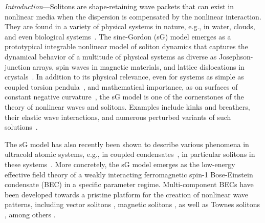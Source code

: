 \documentclass[aps,

               pra,
               twocolumn,
               amsmath,
               amssymb,
               superscriptaddress,
               reprint,
               10pt
              ]{revtex4-2}
\begin{document}
\begin{abstract}
We experimentally generate sine-Gordon-like solitons in a spin-1 spinor Bose-Einstein condensate (BEC) utilizing a robust and reproducible local phase-imprinting scheme. We find that the soliton velocity can be tuned by the effective quadratic Zeeman shift. This enables the investigation of controlled soliton interactions, in which we observe the characteristic
elastic collision behavior of the integrable sine-Gordon model.
The spatial displacement ---the so-called phase shift--- between incoming and outgoing solitons, the signature of their pairwise interaction,
is found to be in quantitative agreement with numerical spin-1 simulations within the error bars.
These results establish spinor BECs as a highly controllable experimental platform for studying aspects of the dynamics of sine-Gordon-like models.
\end{abstract}

\maketitle






\textit{Introduction}---Solitons are shape-retaining wave packets that can exist in nonlinear media when the dispersion is compensated by the nonlinear interaction. They are found in a variety of physical systems in nature, e.g., in water, clouds, and even biological systems~\cite{ablowitz2011nonlinear}.
The sine-Gordon (sG) model emerges as a prototypical integrable nonlinear model of soliton dynamics that captures the dynamical behavior of a multitude of physical systems as diverse as Josephson-junction arrays, spin waves in magnetic materials, and lattice dislocations in crystals~\cite{Cuevas-Maraver2014}.
In addition to its physical relevance, even for systems as simple as coupled torsion pendula~\cite{eilbeck}, and mathematical importance, as on surfaces of constant negative curvature~\cite{mclachlan}, the sG model is one of the cornerstones of the theory of nonlinear waves and solitons.
Examples include kinks and breathers, their elastic wave interactions, and numerous perturbed variants of such solutions~\cite{Kivshar89}.

The sG model has also recently been shown to describe various phenomena in ultracold atomic systems, e.g., in coupled condensates~\cite{Schweigler2017,Bastianello2024sineGordonGHD}, in particular solitons in these systems~\cite{Wybo2023solitons}.
More concretely, the sG model emerges as the low-energy effective field theory of a weakly interacting ferromagnetic spin-1 Bose-Einstein condensate (BEC) \cite{Siovitz2025} in a specific parameter regime.
Multi-component BECs have been developed towards a pristine platform for the creation of nonlinear wave patterns, including vector solitons \cite{Bersano2018,Lannig2020},
magnetic solitons \cite{Farolfi2020,Chai2020, Rabec2025},
as well as Townes solitons \cite{Bakkali_2021}, among
others \cite{Stamper-Kurn2013}.
\end{document}
